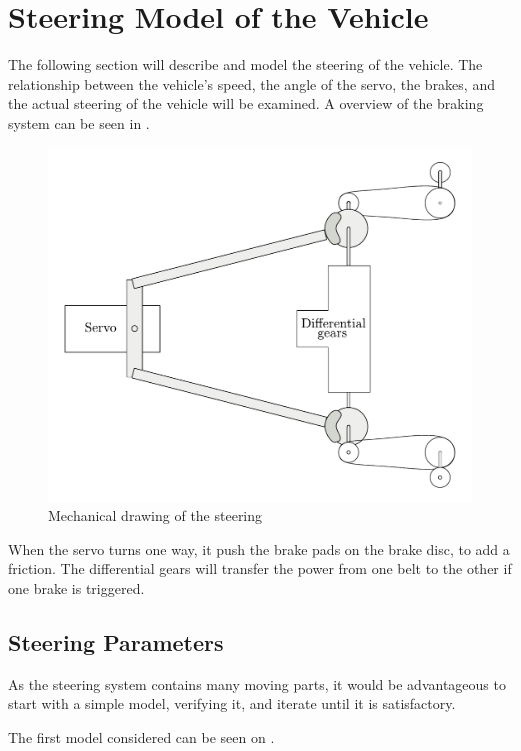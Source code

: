 \section{Steering Model of the Vehicle}\label{sec:SteeringModel}
The following section will describe and model the steering of the vehicle. The relationship between the vehicle's speed, the angle of the servo, the brakes, and the actual steering of the vehicle will be examined. A overview of the braking system can be seen in .

 \begin{figure}[H]
 	\centering
 	\includegraphics[scale=0.6]{figures/steeringMechanical.pdf}
 	\caption{Mechanical drawing of the steering}
 	\label{steeringMechanical}
 \end{figure}

When the servo turns one way, it push the brake pads on the brake disc, to add a friction. The differential gears will transfer the power from one belt to the other if one brake is triggered.

\subsection{Steering Parameters}
As the steering system contains many moving parts, it would be advantageous to start with a simple model, verifying it, and iterate until it is satisfactory. 

The first model considered can be seen on .

